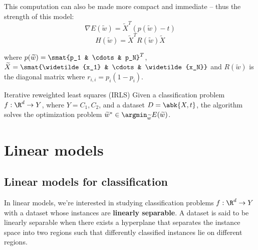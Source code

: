 \documentclass[a4paper, 12pt]{report}
\begin{document}
    This computation can also be made more compact and immediate -- thus the strength of this model:
    \[\nabla E(\widetilde{w}) = \widetilde{X} ^T (p(\widetilde{w}) - t)\]
    \[H(\widetilde{w}) = \widetilde{X}^T R(\widetilde{w}) \widetilde{X}\]

    where $p(\widetilde{w}) = \smat{p_1 & \cdots & p_N}^T$, $\widetilde{X} = \smat{\widetilde{x_1} & \cdots & \widetilde{x_N}}$ and $R(\widetilde{w})$ is the diagonal matrix where $r_{i,i} = p_i(1-p_i)$.

    \begin{framedalgo}{Iterative reweighted least squares (IRLS)}
        Given a classification problem $f : \R^d \to Y$, where $Y = {C_1, C_2}$, and a dataset $D = \abk{X,t}$, the algorithm solves the optimization problem $\widetilde{w}^* \in \argmin_{\widetilde{w}} E(\widetilde{w})$.

        \begin{algorithmic}
                \Do

            \EndFunction
        \end{algorithmic}
    \end{framedalgo}

    \chapter{Linear models}

    \section{Linear models for classification}

    In linear models, we're interested in studying classification problems $f : \R^d \to Y$ with a dataset whose instances are \textbf{linearly separable}. A dataset is said to be linearly separable when there exists a hyperplane that separates the instance space into two regions such that differently classified instances lie on different regions.
\end{document}
